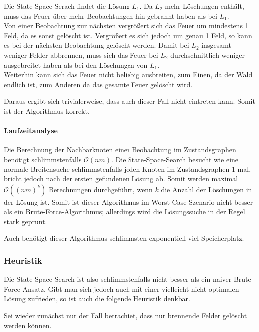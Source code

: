 Die State-Space-Serach findet die Lösung $L_1$. Da $L_2$ mehr Löschungen enthält, muss das Feuer über mehr Beobachtungen hin gebrannt haben als bei $L_1$.\\
Von einer Beobachtung zur nächsten vergrößert sich das Feuer um mindestens 1 Feld, da es sonst gelöscht ist. Vergrößert es sich jedoch um genau 1 Feld, so kann es bei der nächsten Beobachtung gelöscht werden. Damit bei $L_2$ insgesamt weniger Felder abbrennen, muss sich das Feuer bei $L_2$ durchschnittlich weniger ausgebreitet haben als bei den Löschungen von $L_1$.\\
Weiterhin kann sich das Feuer nicht beliebig ausbreiten, zum Einen, da der Wald endlich ist, zum Anderen da das gesamte Feuer gelöscht wird.

Daraus ergibt sich trivialerweise, dass auch dieser Fall nicht eintreten kann. Somit ist der Algorithmus korrekt.

\paragraph{Laufzeitanalyse}

Die Berechnung der Nachbarknoten einer Beobachtung im Zustandsgraphen benötigt schlimmstenfalls $\mathcal{O}(nm)$. Die State-Space-Search besucht wie eine normale Breitensuche schlimmstenfalls jeden Knoten im Zustandsgraphen 1 mal, bricht jedoch nach der ersten gefundenen Lösung ab. Somit werden maximal $\mathcal{O}((nm)^k)$ Berechnungen durchgeführt, wenn $k$ die  Anzahl der Löschungen in der Lösung ist.
Somit ist dieser Algorithmus im Worst-Case-Szenario nicht besser als ein Brute-Force-Algorithmus; allerdings wird die Lösungssuche in der Regel stark geprunt.

Auch benötigt dieser Algorithmus schlimmsten exponentiell viel Speicherplatz.

\subsubsection*{Heuristik}

Die State-Space-Search ist also schlimmstenfalls nicht besser als ein naiver Brute-Force-Ansatz. Gibt man sich jedoch auch mit einer vielleicht nicht optimalen Lösung zufrieden, so ist auch die folgende Heuristik denkbar.

Sei wieder zunächst nur der Fall betrachtet, dass nur brennende Felder gelöscht werden können.

